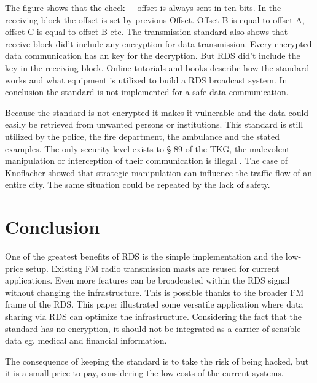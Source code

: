 \documentclass[conference,12pt,a4paper]{IEEEtran}
\begin{document}
	The figure shows that the check + offset is always sent in ten bits. In the receiving block the offset is set by previous Offset. Offset B is equal to offset A, offset C is equal to offset B etc. The transmission standard also shows that receive block did't include any encryption for data transmission. Every encrypted data communication has an key for the decryption. But RDS did't include the key in the receiving block. Online tutorials and books describe how the standard works and what equipment is utilized to build a RDS broadcast system. In conclusion the standard is not implemented for a safe data communication. 
		
	Because the standard is not encrypted it makes it vulnerable and the data could easily be retrieved from unwanted persons or institutions. This standard is still utilized by the police, the fire department, the ambulance and the stated examples. The only security level exists to § 89 of the TKG, the malevolent manipulation or interception of their communication is illegal \cite{telecomGesetz}. The case of Knoflacher showed that strategic manipulation can influence the traffic flow of an entire city. The same situation could be repeated by the lack of safety.
	
	
	\section {Conclusion}
	
	One of the greatest benefits of RDS is the simple implementation and the low-price setup. Existing FM radio transmission masts are reused for current applications. Even more features can be broadcasted within the RDS signal without changing the infrastructure. This is possible thanks to the broader FM frame of the RDS. This paper illustrated some versatile application where data sharing via RDS can optimize the infrastructure. Considering the fact that the standard has no encryption, it should not be integrated as a carrier of sensible data eg. medical and financial information. 
	
	The consequence of keeping the standard is to take the risk of being hacked, but it is a small price to pay, considering the low costs of the current systems. 
	
	
	
	
\end{document}
